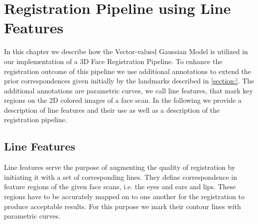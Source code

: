 \chapter{Registration Pipeline using Line Features}
\label{cha:pipelinefeatures}
In this chapter we describe how the Vector-valued Gaussian Model is utilized in our implementation of a 3D Face Registration Pipeline. To enhance the registration outcome of this pipeline we use additional annotations to extend the prior correspondences given initially by the landmarks described in \ref{section:}. The additional annotations are parametric curves, we call line features, that mark key regions on the 2D colored images of a face scan. In the following we provide a description of line features and their use
as well as a description of the registration pipeline. 

\section{Line Features}
Line features serve the purpose of augmenting the quality of registration by initiating it with a set of corresponding lines. They define correspondence in feature regions of the given face scans, i.e. the eyes and ears and lips. These regions have to be accurately mapped on to one another for the registration to produce acceptable results. For this purpose we mark their contour lines with parametric curves. 

